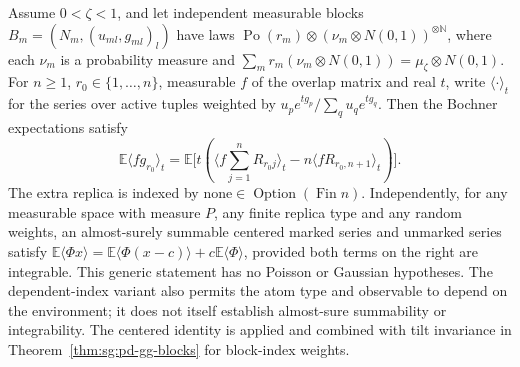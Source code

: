 \begin{lemma}\label{lem:sg:pd-ibp-expectation}
  \leanok
  Assume $0<\zeta<1$, and let independent measurable blocks
  $B_m=(N_m,(u_{ml},g_{ml})_l)$ have laws
  $\operatorname{Po}(r_m)\otimes(\nu_m\otimes N(0,1))^{\otimes\mathbb N}$,
  where each $\nu_m$ is a probability measure and
  $\sum_m r_m(\nu_m\otimes N(0,1))=\mu_\zeta\otimes N(0,1)$.
  For $n\ge1$, $r_0\in\{1,\ldots,n\}$, measurable $f$ of the overlap
  matrix and real $t$, write $\langle\cdot\rangle_t$ for the series over
  active tuples weighted by $u_pe^{tg_p}/\sum_q u_qe^{tg_q}$.
  Then the Bochner expectations satisfy
  \[\mathbb E\langle f g_{r_0}\rangle_t
    =\mathbb E\bigl[t(\langle f\sum_{j=1}^n R_{r_0j}\rangle_t
      -n\langle fR_{r_0,n+1}\rangle_t)\bigr].\]
  The extra replica is indexed by $\mathrm{none}\in\operatorname{Option}(\operatorname{Fin}n)$.
  Independently, for any measurable space with measure $P$, any finite
  replica type and any random weights, an almost-surely summable centered
  marked series and unmarked series satisfy
  $\mathbb E\langle\Phi x\rangle
   =\mathbb E\langle\Phi(x-c)\rangle+c\mathbb E\langle\Phi\rangle$,
  provided both terms on the right are integrable. This generic statement
  has no Poisson or Gaussian hypotheses. The dependent-index variant also
  permits the atom type and observable to depend on the environment; it
  does not itself establish almost-sure summability or integrability.
  The centered identity is applied and combined with tilt invariance in
  Theorem~\ref{thm:sg:pd-gg-blocks} for block-index weights.
\end{lemma}

